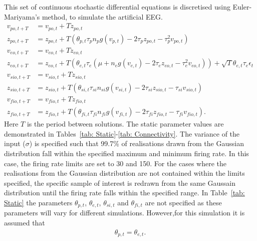 This set of continuous stochastic differential equations is discretised using Euler-Mariyama's method, to simulate the artificial EEG. \begin{align}
v_{po,t+T}&=v_{po,t}+Tz_{po,t}\\
z_{po,t+T}&=z_{po,t}+T(\theta_{p,t}\tau_{p}n_{p}g(v_{p,t})-2\tau_{p}z_{po,t}-\tau_{p}^{2}v_{po,t})\\
v_{eo,t+T}&=v_{eo,t}+Tz_{eo,t}\\
z_{eo,t+T}&=z_{eo,t}+T(\theta_{e,t}\tau_{e}(\mu +n_{e}g(v_{e,t})-2\tau_{e}z_{eo,t}-\tau_{e}^{2}v_{eo,t})) + \sqrt{T}\theta_{e,t}\tau_{e}\epsilon_{t}\\
v_{sio,t+T}&=v_{sio,t}+Tz_{sio,t}\\
z_{sio,t+T}&=z_{sio,t}+T(\theta_{si,t}\tau_{si}n_{si}g(v_{si,t})-2\tau_{si}z_{sio,t}-\tau_{si}v_{sio,t})\\
v_{fio,t+T}&=v_{fio,t}+Tz_{fio,t}\\
z_{fio,t+T}&=z_{fio,t}+T(\theta_{fi,t}\tau_{fi}n_{fi}g(v_{fi,t})-2\tau_{fi}z_{fio,t}-\tau_{fi}v_{fio,t}).
\end{align} Here $T$ is the period between solutions. The static parameter values are demonstrated in  Tables~\ref{tab: Static}-\ref{tab: Connectivity}. The variance of the input ($\sigma$) is specified such that 99.7\% of realisations drawn from the Gaussian distribution fall within the specified maximum and minimum firing rate. In this case, the firing rate limits are set to 30 and 150. For the cases where the realisations from the Gaussian distribution are not contained within the limits specified, the specific sample of interest is redrawn from the same Gaussain distribution until the firing rate falls within the specified range. In Table~\ref{tab: Static} the parameters $\theta_{p,t}$, $\theta_{e,t}$, $\theta_{si,t}$ and $\theta_{fi,t}$ are not specified as these parameters will vary for different simulations. However,for this simulation it is assumed that \begin{align}
\theta_{p,t} = \theta_{e,t}.
\end{align}


